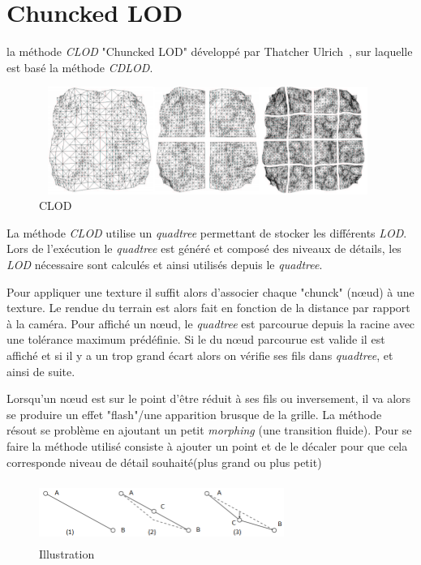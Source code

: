 \section*{Chuncked LOD}
  \label{sec:chunked-lod}

  
  la méthode \textit{CLOD} "Chuncked LOD" développé par Thatcher Ulrich~\cite{CLOD}, sur laquelle est basé la méthode \textit{CDLOD}.

\begin{figure}[!ht]
\centerline{
    \includegraphics[width=11cm,height=3.5cm]{img/clod.png}}
    \caption[CLOD]{CLOD\protect\footnotemark}
    \label{fig:clod}
\end{figure}


  La méthode \emph{CLOD} utilise un \textit{quadtree} permettant de stocker les différents \emph{LOD}. Lors de l'exécution le \emph{quadtree} est généré et composé des niveaux de détails, les \emph{LOD} nécessaire sont calculés et ainsi utilisés depuis le \emph{quadtree}. 
  
  Pour appliquer une texture il suffit alors d'associer chaque "chunck" (n\oe{}ud) à une texture.
  Le rendue du terrain est alors fait en fonction de la distance par rapport à la caméra. Pour affiché un n\oe{}ud, le \emph{quadtree} est parcourue depuis la racine avec une tolérance maximum prédéfinie. Si le du n\oe{}ud parcourue est valide il est affiché et si il y a un trop grand écart alors on vérifie ses fils dans \emph{quadtree}, et ainsi de suite.
 
  Lorsqu'un n\oe{}ud est sur le point d'être réduit à ses fils ou inversement, il va alors se produire un effet "flash"/une apparition brusque de la grille. La méthode résout se problème en ajoutant un petit \emph{morphing} (une transition fluide). Pour se faire la méthode utilisé consiste à ajouter un point et de le décaler pour que cela corresponde niveau de détail souhaité(plus grand ou plus petit)
 
 
 \begin{figure}[!ht]
 \centerline{
    \includegraphics[width=8cm,height=2cm]{img/morph-pop.png}}
    \caption[morph]{ Illustration \protect\footnotemark}
    \label{fig:morph-pop}
\end{figure}


